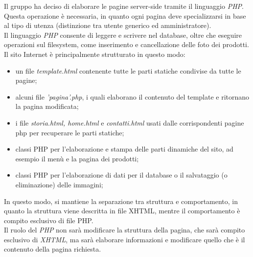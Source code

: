 Il gruppo ha deciso di elaborare le pagine server-side tramite il linguaggio \emph{PHP}. Questa operazione è necessaria, in quanto ogni 
pagina deve specializzarsi in base al tipo di utenza (distinzione tra utente generico ed amministratore).\\
Il linguaggio \emph{PHP} consente di leggere e scrivere nel database, oltre che eseguire operazioni sul filesystem, come inserimento e 
cancellazione delle foto dei prodotti.\\
Il sito Internet è principalmente strutturato in questo modo: 
\begin{itemize}
    \item un file \emph{template.html} contenente tutte le parti statiche condivise da tutte le pagine;
    \item alcuni file \emph{'pagina'.php}, i quali elaborano il contenuto del template e ritornano la pagina modificata;
    \item i file \emph{storia.html, home.html} e \emph{contatti.html} usati dalle corrispondenti pagine php per recuperare le parti statiche;
    \item classi PHP per l'elaborazione e stampa delle parti dinamiche del sito, ad esempio il menù e la pagina dei prodotti;
    \item classi PHP per l'elaborazione di dati per il database o il salvataggio (o eliminazione) delle immagini;
\end{itemize}
In questo modo, si mantiene la separazione tra struttura e comportamento, in quanto la struttura viene descritta in file XHTML, mentre il comportamento
è compito esclusivo di file PHP. \\
Il ruolo del \emph{PHP} non sarà modificare la struttura della pagina, che sarà compito esclusivo di \emph{XHTML}, ma sarà elaborare 
informazioni e modificare quello che è il contenuto della pagina richiesta.\\

